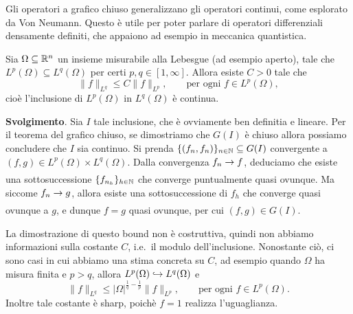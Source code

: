 Gli operatori a grafico chiuso generalizzano gli operatori continui, come esplorato da Von Neumann. Questo è utile per poter parlare di operatori differenziali densamente definiti, che appaiono ad esempio in meccanica quantistica.

	\begin{exercise}
	Sia $\Omega \subseteq \mathbb{R}^n$ un insieme misurabile alla Lebesgue (ad esempio aperto), tale che $L^p(\Omega) \subseteq L^q(\Omega)$ per certi $p,q \in [1, \infty]$.
	Allora esiste $C > 0$ tale che
	\begin{equation*}
		\|f\|_{L^q} \leq C\|f\|_{L^p}, \qquad \text{per ogni $f \in L^p(\Omega)$},
	\end{equation*}
	cioè l'inclusione di $L^p(\Omega)$ in $L^q(\Omega)$ è continua.

	\textbf{Svolgimento}. Sia $I$ tale inclusione, che è ovviamente ben definitia e lineare. Per il teorema del grafico chiuso, se dimostriamo che $G(I)$ è chiuso allora possiamo concludere che $I$ sia continuo.
	Si prenda $\{(f_n, f_n)\}_{n \in \mathbb{N}} \subseteq G(I)$ convergente a $(f,g) \in L^p(\Omega) \times L^q(\Omega)$. Dalla convergenza $f_n \underset{{}}{\rightarrow} f$, deduciamo che esiste una sottosuccessione $\{f_{n_h}\}_{h \in \mathbb{N}}$ che converge puntualmente quasi ovunque. Ma siccome $f_n \underset{{}}{\rightarrow} g$, allora esiste una sottosuccessione di $f_h$ che converge quasi ovunque a $g$, e dunque $f = g$ quasi ovunque, per cui $(f,g) \in G(I)$.
\end{exercise}

\begin{remark}
	La dimostrazione di questo bound non è costruttiva, quindi non abbiamo informazioni sulla costante $C$, i.e.\ il modulo dell'inclusione. Nonostante ciò, ci sono casi in cui abbiamo una stima concreta su $C$, ad esempio quando $\Omega$ ha misura finita e $p > q$, allora $L^p(\Omega) \hookrightarrow L^q(\Omega)$ e
	\begin{equation*}
		\|f\|_{L^q} \leq |\Omega|^{\frac1q - \frac1p}\|f\|_{L^p}, \qquad \text{per ogni $f \in L^p(\Omega)$}.
	\end{equation*}
	Inoltre tale costante è sharp, poichè $f=1$ realizza l'uguaglianza.
\end{remark}

